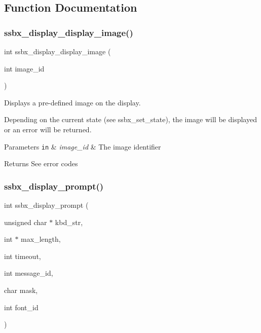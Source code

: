 \subsection{Function Documentation}
\hypertarget{group__ssbx___i_o_ga52d5005d7bb36355592b9ef2309281e2}{}\label{group__ssbx___i_o_ga52d5005d7bb36355592b9ef2309281e2}
\subsubsection{\texorpdfstring{ssbx\+\_\+display\+\_\+display\+\_\+image()}{ssbx\_display\_display\_image()}}
{\footnotesize\ttfamily int ssbx\+\_\+display\+\_\+display\+\_\+image (\begin{DoxyParamCaption}\item[{int}]{image\+\_\+id }\end{DoxyParamCaption})}



Displays a pre-\/defined image on the display.

Depending on the current state (see ssbx\+\_\+set\+\_\+state), the image will be displayed or an error will be returned.


\begin{DoxyParams}[1]{Parameters}
\mbox{\tt in}  & {\em image\+\_\+id} & The image identifier\\
\hline
\end{DoxyParams}
\begin{DoxyReturn}{Returns}
See error codes
\end{DoxyReturn}
\hypertarget{group__ssbx___i_o_ga701c4c43823bad80a39745de2b5ad3af}{}\label{group__ssbx___i_o_ga701c4c43823bad80a39745de2b5ad3af}
\subsubsection{\texorpdfstring{ssbx\+\_\+display\+\_\+prompt()}{ssbx\_display\_prompt()}}
{\footnotesize\ttfamily int ssbx\+\_\+display\+\_\+prompt (\begin{DoxyParamCaption}\item[{unsigned char $\ast$}]{kbd\+\_\+str, }\item[{int $\ast$}]{max\+\_\+length, }\item[{int}]{timeout, }\item[{int}]{message\+\_\+id, }\item[{char}]{mask, }\item[{int}]{font\+\_\+id }\end{DoxyParamCaption})}



